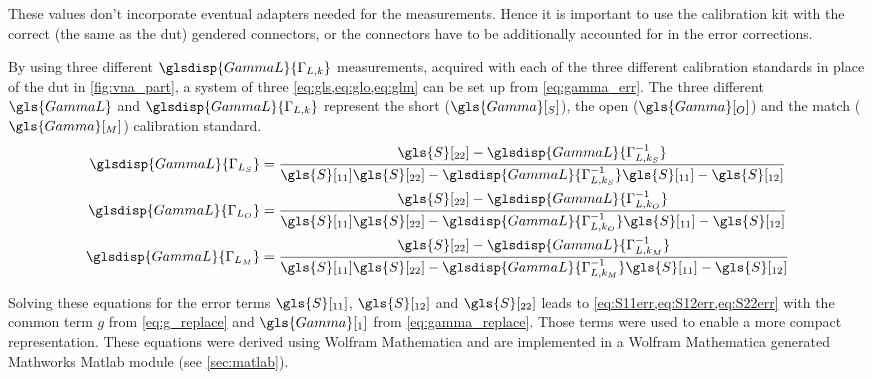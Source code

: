 \documentclass[12pt,a4paper,parskip=full,abstract=true,BCOR=12mm]{scrreprt}
\begin{document}
These values don't incorporate eventual adapters needed for the measurements.
Hence it is important to use the calibration kit with the correct (the same as the \gls{dut}) gendered connectors, or
the connectors have to be additionally accounted for in the error corrections.

By using three different $\glsdisp{GammaL}{\Gamma_{L,k}}$ measurements, acquired with each of the three different calibration standards in place of the \gls{dut} in \cref{fig:vna_part},
a system of three \cref{eq:gls,eq:glo,eq:glm} can be set up from \cref{eq:gamma_err}. The
three different $\gls{GammaL}$ and $\glsdisp{GammaL}{\Gamma_{L,k}}$ represent the short ($\gls{Gamma}[_S]$),
the open ($\gls{Gamma}[_O]$) and the match ($\gls{Gamma}[_M]$) calibration standard.
\begin{align}
    \label{eq:gls} \glsdisp{GammaL}{\Gamma_{L_S}} & = \frac{\gls{S}[_{22}] - \glsdisp{GammaL}{\Gamma_{L,k_S}^{-1}}}{\gls{S}[_{11}] \gls{S}[_{22}] - \glsdisp{GammaL}{\Gamma_{L,k_S}^{-1}}\gls{S}[_{11}] - \gls{S}[_{12}]} \\
    \label{eq:glo} \glsdisp{GammaL}{\Gamma_{L_O}} & = \frac{\gls{S}[_{22}] - \glsdisp{GammaL}{\Gamma_{L,k_O}^{-1}}}{\gls{S}[_{11}] \gls{S}[_{22}] - \glsdisp{GammaL}{\Gamma_{L,k_O}^{-1}}\gls{S}[_{11}] - \gls{S}[_{12}]} \\
    \label{eq:glm} \glsdisp{GammaL}{\Gamma_{L_M}} & = \frac{\gls{S}[_{22}] - \glsdisp{GammaL}{\Gamma_{L,k_M}^{-1}}}{\gls{S}[_{11}] \gls{S}[_{22}] - \glsdisp{GammaL}{\Gamma_{L,k_M}^{-1}}\gls{S}[_{11}] - \gls{S}[_{12}]}
\end{align}

Solving these equations for the error terms $\gls{S}[_{11}]$, $\gls{S}[_{12}]$ and $\gls{S}[_{22}]$
leads to \cref{eq:S11err,eq:S12err,eq:S22err} with the common term $g$ from
\cref{eq:g_replace} and $\gls{Gamma}[_1]$ from \cref{eq:gamma_replace}. Those terms
were used to enable a more compact representation. These equations were
derived using Wolfram Mathematica and are implemented in a Wolfram Mathematica generated
Mathworks Matlab module (see \cref{sec:matlab}).
\end{document}
